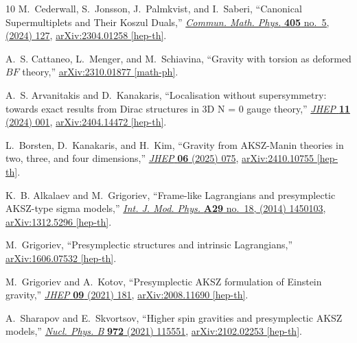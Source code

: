 \documentclass[a4paper,12pt]{article}
\numberwithin{equation}{section} %
\numberwithin{equation}{section}
\begin{document}
\begin{thebibliography}{10}
M.~Cederwall, S.~Jonsson, J.~Palmkvist, and I.~Saberi, ``{Canonical Supermultiplets and Their Koszul Duals},'' \href{http://dx.doi.org/10.1007/s00220-024-04990-z}{{\em Commun. Math. Phys.} {\bfseries 405} no.~5, (2024) 127}, \href{http://arxiv.org/abs/2304.01258}{{\ttfamily arXiv:2304.01258 [hep-th]}}.

A.~S. Cattaneo, L.~Menger, and M.~Schiavina, ``{Gravity with torsion as deformed $BF$ theory},'' \href{http://arxiv.org/abs/2310.01877}{{\ttfamily arXiv:2310.01877 [math-ph]}}.

A.~S. Arvanitakis and D.~Kanakaris, ``{Localisation without supersymmetry: towards exact results from Dirac structures in 3D N = 0 gauge theory},'' \href{http://dx.doi.org/10.1007/JHEP11(2024)001}{{\em JHEP} {\bfseries 11} (2024) 001}, \href{http://arxiv.org/abs/2404.14472}{{\ttfamily arXiv:2404.14472 [hep-th]}}.

L.~Borsten, D.~Kanakaris, and H.~Kim, ``{Gravity from AKSZ-Manin theories in two, three, and four dimensions},'' \href{http://dx.doi.org/10.1007/JHEP06(2025)075}{{\em JHEP} {\bfseries 06} (2025) 075}, \href{http://arxiv.org/abs/2410.10755}{{\ttfamily arXiv:2410.10755 [hep-th]}}.

K.~B. Alkalaev and M.~Grigoriev, ``{Frame-like Lagrangians and presymplectic AKSZ-type sigma models},'' \href{http://dx.doi.org/10.1142/S0217751X14501036}{{\em Int. J. Mod. Phys.} {\bfseries A29} no.~18, (2014) 1450103},
\href{http://arxiv.org/abs/1312.5296}{{\ttfamily arXiv:1312.5296 [hep-th]}}.

M.~Grigoriev, ``{Presymplectic structures and intrinsic Lagrangians},''
\href{http://arxiv.org/abs/1606.07532}{{\ttfamily arXiv:1606.07532 [hep-th]}}.

M.~Grigoriev and A.~Kotov, ``{Presymplectic AKSZ formulation of Einstein gravity},'' \href{http://dx.doi.org/10.1007/JHEP09(2021)181}{{\em JHEP} {\bfseries 09} (2021) 181}, \href{http://arxiv.org/abs/2008.11690}{{\ttfamily arXiv:2008.11690 [hep-th]}}.

A.~Sharapov and E.~Skvortsov, ``{Higher spin gravities and presymplectic AKSZ models},'' \href{http://dx.doi.org/10.1016/j.nuclphysb.2021.115551}{{\em Nucl. Phys. B} {\bfseries 972} (2021) 115551}, \href{http://arxiv.org/abs/2102.02253}{{\ttfamily arXiv:2102.02253 [hep-th]}}.


\end{thebibliography}
\end{document}
